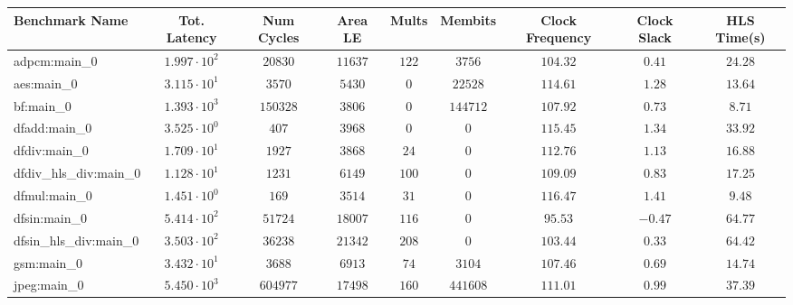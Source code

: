 \begin{tabular}{|l|c|c|c|c|c|c|c|c|}
\hline
Benchmark Name          & Tot. Latency           & Num Cycles  & Area LE    & Mults   & Membits    & Clock Frequency & Clock Slack & HLS Time(s) \\
\hline
adpcm:main\_0           & $ 1.997 \cdot 10^{2} $ & $ 20830   $ & $ 11637  $ & $ 122 $ & $ 3756   $ & $ 104.32      $ & $ 0.41    $ & $ 24.28   $ \\
aes:main\_0             & $ 3.115 \cdot 10^{1} $ & $ 3570    $ & $ 5430   $ & $ 0   $ & $ 22528  $ & $ 114.61      $ & $ 1.28    $ & $ 13.64   $ \\
bf:main\_0              & $ 1.393 \cdot 10^{3} $ & $ 150328  $ & $ 3806   $ & $ 0   $ & $ 144712 $ & $ 107.92      $ & $ 0.73    $ & $ 8.71    $ \\
dfadd:main\_0           & $ 3.525 \cdot 10^{0} $ & $ 407     $ & $ 3968   $ & $ 0   $ & $ 0      $ & $ 115.45      $ & $ 1.34    $ & $ 33.92   $ \\
dfdiv:main\_0           & $ 1.709 \cdot 10^{1} $ & $ 1927    $ & $ 3868   $ & $ 24  $ & $ 0      $ & $ 112.76      $ & $ 1.13    $ & $ 16.88   $ \\
dfdiv\_hls\_div:main\_0 & $ 1.128 \cdot 10^{1} $ & $ 1231    $ & $ 6149   $ & $ 100 $ & $ 0      $ & $ 109.09      $ & $ 0.83    $ & $ 17.25   $ \\
dfmul:main\_0           & $ 1.451 \cdot 10^{0} $ & $ 169     $ & $ 3514   $ & $ 31  $ & $ 0      $ & $ 116.47      $ & $ 1.41    $ & $ 9.48    $ \\
dfsin:main\_0           & $ 5.414 \cdot 10^{2} $ & $ 51724   $ & $ 18007  $ & $ 116 $ & $ 0      $ & $ 95.53       $ & $ -0.47   $ & $ 64.77   $ \\
dfsin\_hls\_div:main\_0 & $ 3.503 \cdot 10^{2} $ & $ 36238   $ & $ 21342  $ & $ 208 $ & $ 0      $ & $ 103.44      $ & $ 0.33    $ & $ 64.42   $ \\
gsm:main\_0             & $ 3.432 \cdot 10^{1} $ & $ 3688    $ & $ 6913   $ & $ 74  $ & $ 3104   $ & $ 107.46      $ & $ 0.69    $ & $ 14.74   $ \\
jpeg:main\_0            & $ 5.450 \cdot 10^{3} $ & $ 604977  $ & $ 17498  $ & $ 160 $ & $ 441608 $ & $ 111.01      $ & $ 0.99    $ & $ 37.39   $ \\

\end{tabular}
